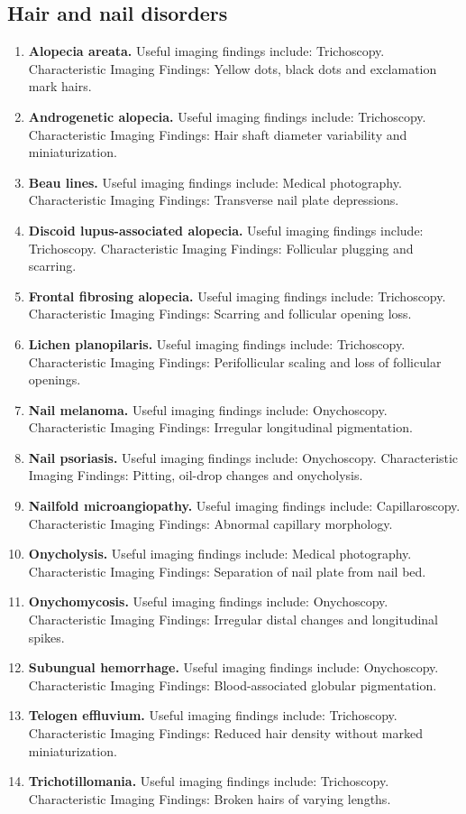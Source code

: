 \subsection{Hair and nail disorders}
\begin{enumerate}[leftmargin=*,itemsep=0.45em,topsep=0.4em]
\item \textbf{Alopecia areata.} Useful imaging findings include: Trichoscopy. Characteristic Imaging Findings: Yellow dots, black dots and exclamation mark hairs.
\item \textbf{Androgenetic alopecia.} Useful imaging findings include: Trichoscopy. Characteristic Imaging Findings: Hair shaft diameter variability and miniaturization.
\item \textbf{Beau lines.} Useful imaging findings include: Medical photography. Characteristic Imaging Findings: Transverse nail plate depressions.
\item \textbf{Discoid lupus-associated alopecia.} Useful imaging findings include: Trichoscopy. Characteristic Imaging Findings: Follicular plugging and scarring.
\item \textbf{Frontal fibrosing alopecia.} Useful imaging findings include: Trichoscopy. Characteristic Imaging Findings: Scarring and follicular opening loss.
\item \textbf{Lichen planopilaris.} Useful imaging findings include: Trichoscopy. Characteristic Imaging Findings: Perifollicular scaling and loss of follicular openings.
\item \textbf{Nail melanoma.} Useful imaging findings include: Onychoscopy. Characteristic Imaging Findings: Irregular longitudinal pigmentation.
\item \textbf{Nail psoriasis.} Useful imaging findings include: Onychoscopy. Characteristic Imaging Findings: Pitting, oil-drop changes and onycholysis.
\item \textbf{Nailfold microangiopathy.} Useful imaging findings include: Capillaroscopy. Characteristic Imaging Findings: Abnormal capillary morphology.
\item \textbf{Onycholysis.} Useful imaging findings include: Medical photography. Characteristic Imaging Findings: Separation of nail plate from nail bed.
\item \textbf{Onychomycosis.} Useful imaging findings include: Onychoscopy. Characteristic Imaging Findings: Irregular distal changes and longitudinal spikes.
\item \textbf{Subungual hemorrhage.} Useful imaging findings include: Onychoscopy. Characteristic Imaging Findings: Blood-associated globular pigmentation.
\item \textbf{Telogen effluvium.} Useful imaging findings include: Trichoscopy. Characteristic Imaging Findings: Reduced hair density without marked miniaturization.
\item \textbf{Trichotillomania.} Useful imaging findings include: Trichoscopy. Characteristic Imaging Findings: Broken hairs of varying lengths.
\end{enumerate}

